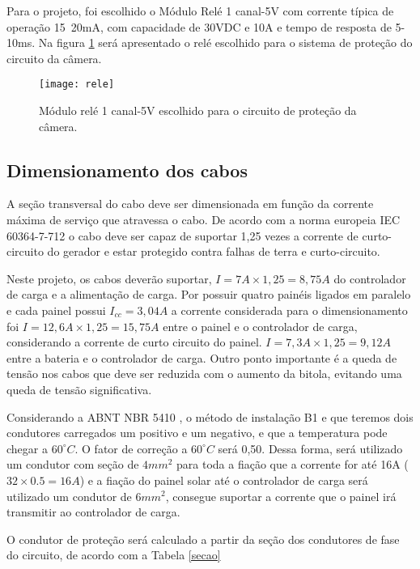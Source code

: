 Para o projeto, foi escolhido o Módulo Relé 1 canal-5V com corrente típica de operação 15~20mA, com capacidade de 30VDC e 10A e tempo de resposta de 5-10ms. Na figura \ref{fig:rele} será apresentado o relé escolhido para o sistema de proteção do circuito da câmera.

\begin{figure}[H]
\centering
\texttt{[image: rele]}
    \caption{Módulo relé 1 canal-5V escolhido para o circuito de proteção da câmera.}
\label{fig:rele}
\end{figure}
\FloatBarrier

\subsection{Dimensionamento dos cabos}

A seção transversal do cabo deve ser dimensionada em função da corrente máxima de serviço que atravessa o cabo. De acordo com a norma europeia IEC 60364-7-712 o cabo deve ser capaz de suportar 1,25 vezes a corrente de curto-circuito do gerador e estar protegido contra falhas de terra e curto-circuito. 

Neste projeto, os cabos deverão suportar, $I = 7A \times 1,25 = 8,75A$ do controlador de carga e a alimentação de carga. Por possuir quatro painéis ligados em paralelo e cada painel possui $I_{cc} = 3,04 A$ a corrente considerada para o dimensionamento foi $I = 12,6A \times 1,25 = 15,75 A$ entre o painel e o  controlador de carga, considerando a corrente de curto circuito do painel. $I = 7,3A \times 1,25 = 9,12 A$ entre a bateria e o controlador de carga. Outro ponto importante é a queda de tensão nos cabos que deve ser reduzida com o aumento da bitola, evitando uma queda de tensão significativa.

Considerando a ABNT NBR 5410 \cite{protecao}, o método de instalação B1 e que teremos dois condutores carregados um positivo e um negativo, e que a temperatura pode chegar a $60^{\circ}C$. O fator de correção a $60^{\circ}C$ será 0,50.  Dessa forma, será utilizado um condutor com seção de $4mm^2$ para toda a fiação que a corrente for até 16A ($32 \times 0.5 = 16A$) e a fiação do painel solar até o controlador de carga será utilizado um condutor de $6mm^2$, consegue suportar a corrente que o painel irá transmitir ao controlador de carga. 

O condutor de proteção será calculado a partir da seção dos condutores de fase do circuito, de acordo com a Tabela \ref{secao}

